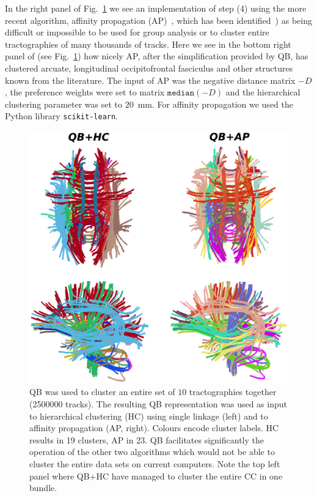 \documentclass{bioinfo}
\begin{document}
In the right panel of Fig.~\ref{Flo:LSC+HC+AP} we see an implementation
of step (4) using the more recent algorithm, affinity propagation
(AP)~\citep{dueck2009affinity}, which has been
identified~\citep{malcolm2009filtered}) as being difficult or impossible
to be used for group analysis or to cluster entire tractographies of
many thousands of tracks.
Here we see in the bottom right panel of (see Fig.~\ref{Flo:LSC+HC+AP})
how nicely AP, after the simplification provided by QB, has clustered
arcuate, longitudinal occipitofrontal fasciculus and other structures
known from the literature. The input of AP was the negative distance
matrix $-D$, the preference weights were set to matrix $\mathtt{median}(-D)$
and the hierarchical clustering parameter was set to $20$~mm.
For affinity propagation we used the Python library \texttt{scikit-learn}.

\begin{figure}
\begin{centering}
\includegraphics[scale=0.6]{Figures/Fig_8_QB_with_others}
\par\end{centering}
\caption{QB was used to cluster an entire set of $10$ tractographies
  together (\num{2500000} tracks). The resulting QB representation was used as
  input to hierarchical clustering (HC) using single linkage (left)
  and to affinity propagation (AP, right). Colours encode cluster
  labels. HC results in 19 clusters, AP in 23. QB facilitates
  significantly the operation of the other two algorithms which would
  not be able to cluster the entire data sets on current computers. Note
  the top left panel where QB+HC have managed to cluster the entire CC
  in one bundle.\label{Flo:LSC+HC+AP}}
\end{figure}
\end{document}
